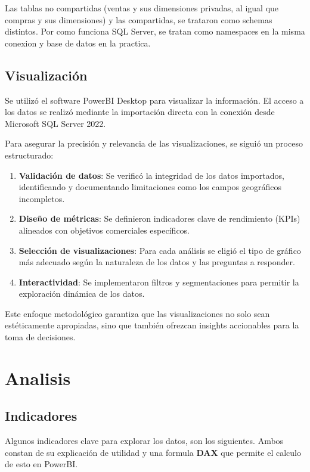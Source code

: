 \documentclass{article}
\begin{document}
Las tablas no compartidas (ventas y sus dimensiones privadas, al igual que compras y sus dimensiones) y las compartidas, se trataron como schemas distintos. Por como funciona SQL Server, se tratan como namespaces en la misma conexion y base de datos en la practica.

\subsection{Visualización}
Se utilizó el software PowerBI Desktop para visualizar la información. El acceso a los datos se realizó mediante la importación directa con la conexión desde Microsoft SQL Server 2022.

Para asegurar la precisión y relevancia de las visualizaciones, se siguió un proceso estructurado:

\begin{enumerate}
    \item \textbf{Validación de datos}: Se verificó la integridad de los datos importados, identificando y documentando limitaciones como los campos geográficos incompletos.
    \item \textbf{Diseño de métricas}: Se definieron indicadores clave de rendimiento (KPIs) alineados con objetivos comerciales específicos.
    \item \textbf{Selección de visualizaciones}: Para cada análisis se eligió el tipo de gráfico más adecuado según la naturaleza de los datos y las preguntas a responder.
    \item \textbf{Interactividad}: Se implementaron filtros y segmentaciones para permitir la exploración dinámica de los datos.
\end{enumerate}

Este enfoque metodológico garantiza que las visualizaciones no solo sean estéticamente apropiadas, sino que también ofrezcan insights accionables para la toma de decisiones.

\section{Analisis}
\subsection{Indicadores}
Algunos indicadores clave para explorar los datos, son los siguientes. Ambos constan de su explicación de utilidad y una formula \textbf{DAX} que permite el calculo de esto en PowerBI.
\end{document}
